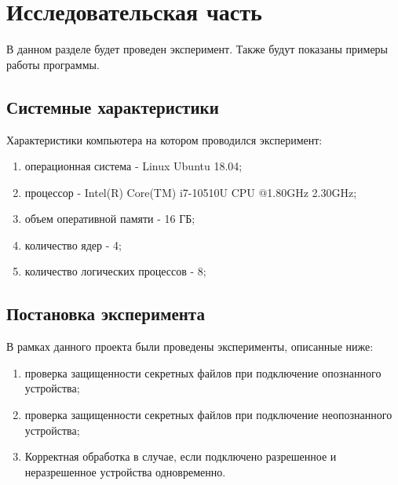 \documentclass[a4paper, 10pt]{article}
\begin{document}
\clearpage
\newpage
\section{Исследовательская часть }
	\hspace*{5mm} В данном разделе будет проведен эксперимент. Также будут показаны примеры работы программы.
	\subsection{Системные характеристики}
	Характеристики компьютера на котором проводился эксперимент:
	\begin{enumerate}
		\item операционная система - Linux Ubuntu 18.04;
		\item процессор - Intel(R) Core(TM) i7-10510U CPU @1.80GHz 2.30GHz;
		\item объем оперативной памяти - 16 ГБ;
		\item количество ядер - 4;
		\item количество логических процессов - 8;
	\end{enumerate}
	\subsection{Постановка эксперимента}
	В рамках данного проекта были проведены эксперименты, описанные ниже:
	\begin{enumerate}
		\item проверка защищенности секретных файлов при подключение опознанного устройства;
		\item проверка защищенности секретных файлов при подключение неопознанного устройства;
		\item Корректная обработка в случае, если подключено разрешенное и неразрешенное устройства одновременно.
	\end{enumerate}
\end{document}
